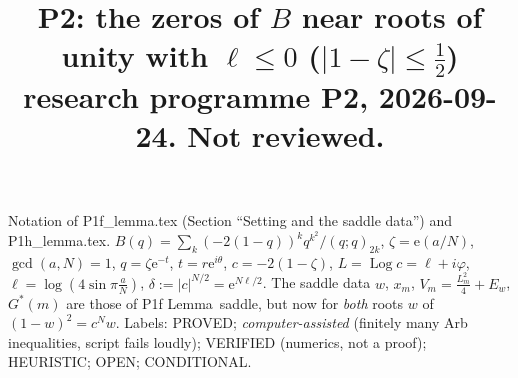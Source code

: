 \documentclass[11pt]{article}
\title{P2: the zeros of $B$ near roots of unity with $\ell\le0$ ($|1-\zeta|\le\frac12$)\\
\small research programme P2, 2026-09-24. Not reviewed.}
\date{}
\theoremstyle{remark}\newtheorem{remark}[theorem]{Remark}
\newcommand{\e}{\mathrm{e}}
\begin{document}
\maketitle

Notation of P1f\_lemma.tex (Section ``Setting and the saddle data'') and P1h\_lemma.tex. $B(q)=\sum_k(-2(1-q))^kq^{k^2}/(q;q)_{2k}$,
$\zeta=\e(a/N)$, $\gcd(a,N)=1$, $q=\zeta\e^{-t}$, $t=r\e^{i\theta}$, $c=-2(1-\zeta)$, $L=\operatorname{Log}c=\ell+i\varphi$,
$\ell=\log(4\sin\pi\frac aN)$, $\delta:=|c|^{N/2}=\e^{N\ell/2}$. The saddle data $w$, $x_m$, $V_m=\frac{L_m^2}4+E_w$, $G^*(m)$ are those of P1f
Lemma~saddle, but now for \emph{both} roots $w$ of $(1-w)^2=c^Nw$.
Labels: PROVED; \emph{computer-assisted} (finitely many Arb inequalities, script fails loudly); VERIFIED (numerics, not a proof);
HEURISTIC; OPEN; CONDITIONAL.
\end{document}

